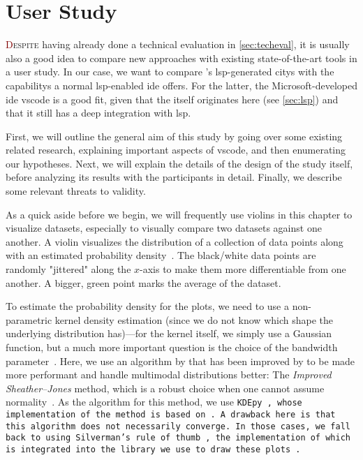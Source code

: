 \documentclass[../thesis]{subfiles}
\begin{document}
\chapter{User Study}\label{ch:evaluation}

\lettrine[lines=3]{\textcolor{Maroon}{D}}{espite} having already done a technical evaluation in \cref{sec:techeval}, it is usually also a good idea to compare new approaches with existing state-of-the-art tools in a user study.
In our case, we want to compare \SEE{}'s \gls{lsp}-generated \glspl{city} with the \glspl{capability} a normal \gls{lsp}-enabled \gls{ide} offers.
For the latter, the Microsoft-developed \gls{ide} \gls{vscode} is a good fit, given that the  itself originates here (see \cref{sec:lsp}) and that it still has a deep integration with \gls{lsp}.

First, we will outline the general aim of this study by going over some existing related research, explaining important aspects of \gls{vscode}, and then enumerating our hypotheses.
Next, we will explain the details of the design of the study itself, before analyzing its results with the \participants{} participants in detail.
Finally, we describe some relevant threats to validity.

As a quick aside before we begin, we will frequently use \glspl*{violin} in this chapter to visualize datasets, especially to visually compare two datasets against one another.
A \gls{violin} visualizes the distribution of a collection of data points along with an estimated probability density~\cite{hintze1998}.
The black/white data points are randomly "jittered" along the $x$-axis to make them more differentiable from one another.
A bigger, green point marks the average of the dataset.

To estimate the probability density for the plots, we need to use a non-parametric kernel density estimation (since we do not know which shape the underlying distribution has)---for the kernel itself, we simply use a Gaussian function, but a much more important question is the choice of the bandwidth parameter~\cite{heidenreich2013}.
Here, we use an algorithm by \textcite{sheather1991} that has been improved by \textcite{botev2010a} to be made more performant and handle multimodal distributions better:
The \emph{Improved Sheather--Jones} method, which is a robust choice when one cannot assume normality~\cite{akinshin2020}.
As the algorithm for this method, we use \tt{KDEpy}~\cite{odland2018}, whose implementation of the method is based on \textcite[326--328]{kroese2011}.
A drawback here is that this algorithm does not necessarily converge.
In those cases, we fall back to using Silverman's rule of thumb~\cite{silverman1986}, the implementation of which is integrated into the library we use to draw these plots~\cite{callil-soares2024}.
\end{document}
